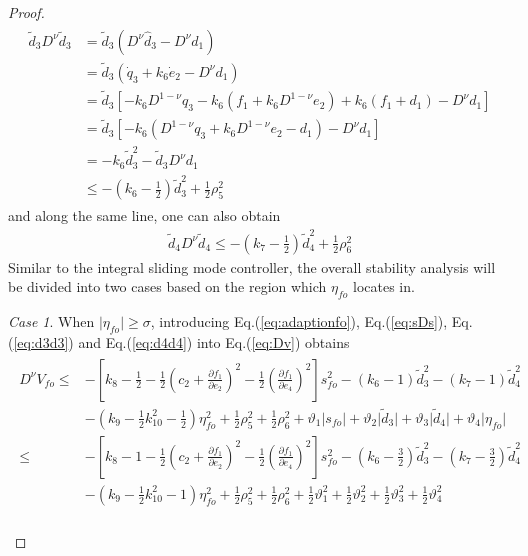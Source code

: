 \documentclass[ShortAfour]{sage}
\theoremstyle{plain}
\theoremstyle{remark}
\newtheorem{mycase1}{Case}
\begin{document}
\begin{proof}
  \begin{align}\begin{split}
    \tilde d_3D^\nu \tilde d_3&=\tilde d_3\left(D^\nu\hat d_3-D^\nu d_1\right)\\
    &=\tilde d_3\left(\dot q_3+k_6\dot e_2-D^\nu d_1\right)\\
    &=\tilde d_3\left[-k_6D^{1-\nu}q_3-k_6(f_1+k_6D^{1-\nu}e_2)+k_6(f_1+d_1)-D^\nu d_1\right]\\
    &=\tilde d_3\left[-k_6(D^{1-\nu}q_3+k_6D^{1-\nu}e_2-d_1)-D^\nu d_1\right]\\
    &=-k_6\tilde d_3^2-\tilde d_3D^\nu d_1\\
    &\le-\left(k_6-\frac{1}{2}\right)\tilde d_3^2+\frac{1}{2}\rho_5^2\label{eq:d3d3}
  \end{split}\end{align}
  and along the same line, one can also obtain
  \begin{align}
    \tilde d_4D^\nu \tilde d_4 \le-\left(k_7-\frac{1}{2}\right)\tilde d_4^2+\frac{1}{2}\rho_6^2\label{eq:d4d4}
  \end{align}
  Similar to the integral sliding mode controller, the overall stability analysis will be divided into two cases based on the region which $\eta_{fo}$ locates in.
  \begin{mycase1}
    When $\vert\eta_{fo}\vert\ge\sigma$, introducing Eq.(\ref{eq:adaptionfo}), Eq.(\ref{eq:sDs}), Eq.(\ref{eq:d3d3}) and Eq.(\ref{eq:d4d4}) into Eq.(\ref{eq:Dv}) obtains
    \begin{align}\begin{split}
      D^\nu V_{fo} \le &-\left[k_8-\frac{1}{2}-\frac{1}{2}\left(c_2+\frac{\partial f_1}{\partial e_2}\right)^2-\frac{1}{2}\left(\frac{\partial f_1}{\partial e_4}\right)^2\right]s_{fo}^2-\left(k_6-1\right)\tilde{d}_3^2-\left(k_7-1\right)\tilde{d}_4^2\\
      &-\left(k_9-\frac{1}{2}k_{10}^2-\frac{1}{2}\right)\eta_{fo}^2+\frac{1}{2}\rho_5^2 +\frac{1}{2}\rho_6^2+\vartheta_1\vert s_{fo}\vert+\vartheta_2\vert \tilde d_3\vert+\vartheta_3\vert \tilde d_4\vert+\vartheta_4\vert \eta_{fo}\vert\\
      \le &-\left[k_8-1-\frac{1}{2}\left(c_2+\frac{\partial f_1}{\partial e_2}\right)^2-\frac{1}{2}\left(\frac{\partial f_1}{\partial e_4}\right)^2\right]s_{fo}^2-\left(k_6-\frac{3}{2}\right)\tilde{d}_3^2-\left(k_7-\frac{3}{2}\right)\tilde{d}_4^2\\
      &-\left(k_9-\frac{1}{2}k_{10}^2-1\right)\eta_{fo}^2+\frac{1}{2}\rho_5^2 +\frac{1}{2}\rho_6^2+\frac{1}{2}\vartheta_1^2+\frac{1}{2}\vartheta_2^2+\frac{1}{2}\vartheta_3^2+\frac{1}{2}\vartheta_4^2\\

\end{split}
\end{align}
\end{mycase1}
\end{proof}
\end{document}
